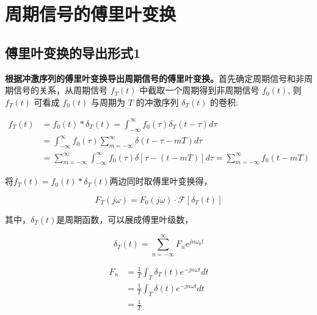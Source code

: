 \documentclass[UTF8]{article}
\theoremstyle{definition}
\begin{document}
\section{周期信号的傅里叶变换}
\subsection{傅里叶变换的导出形式1}
\textbf{根据冲激序列的傅里叶变换导出周期信号的傅里叶变换。}首先确定周期信号和非周期信号的关系，从周期信号 $f_T(t)$ 中截取一个周期得到非周期信号 $f_0(t)$, 则 $f_T(t)$ 可看成 $f_0(t)$ 与周期为 $T$ 的冲激序列 $\delta_T(t)$ 的卷积:

\begin{equation*}
\begin{aligned}
f_T(t) & =f_0(t) * \delta_T(t)=\int_{-\infty}^{\infty} f_0(\tau) \delta_T(t-\tau) d \tau \\
& =\int_{-\infty}^{\infty} f_0(\tau) \sum_{m=-\infty}^{\infty} \delta(t-\tau-m T) d \tau \\
& =\sum_{m=-\infty}^{\infty} \int_{-\infty}^{\infty} f_0(\tau) \delta [ \tau - (t-m T) ]d \tau
=\sum_{m=-\infty}^{\infty} f_0(t-m T)
\end{aligned}
\end{equation*}


将$f_T(t) =f_0(t) * \delta_T(t)$两边同时取傅里叶变换得，



\begin{equation*}
F_T(j \omega)=F_0(j \omega) \cdot \mathscr{F} [ \delta_T(t) ]
\end{equation*}


其中，$\delta_T(t)$是周期函数，可以展成傅里叶级数，


\begin{equation*}
\delta_T(t) = \sum_{n=-\infty}^{\infty} F_ne^{jn\omega_0t}%
\end{equation*}

\begin{equation*}
\begin{aligned}
F_n & = \frac{1}{T} \int_T \delta_T(t) e^{-jn\omega t}dt \\
& = \frac{1}{T} \int_T \delta(t) e^{-jn\omega t}dt \\
& = \frac{1}{T}
\end{aligned}
\end{equation*}
\end{document}
